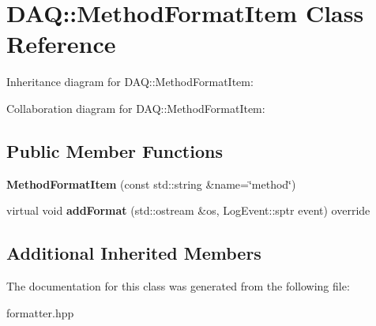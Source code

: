\hypertarget{classDAQ_1_1MethodFormatItem}{}\section{D\+AQ\+:\+:Method\+Format\+Item Class Reference}
\label{classDAQ_1_1MethodFormatItem}


Inheritance diagram for D\+AQ\+:\+:Method\+Format\+Item\+:


Collaboration diagram for D\+AQ\+:\+:Method\+Format\+Item\+:
\subsection*{Public Member Functions}
\begin{DoxyCompactItemize}
\item 
\mbox{\label{classDAQ_1_1MethodFormatItem_a5f5ff7e74d5b57439f9d1018093a7abe}} 
{\bfseries Method\+Format\+Item} (const std\+::string \&name=\char`\"{}method\char`\"{})
\item 
\mbox{\label{classDAQ_1_1MethodFormatItem_a1b027d147aee9bb5ac113894d18a5289}} 
virtual void {\bfseries add\+Format} (std\+::ostream \&os, Log\+Event\+::sptr event) override
\end{DoxyCompactItemize}
\subsection*{Additional Inherited Members}


The documentation for this class was generated from the following file\+:\begin{DoxyCompactItemize}
\item 
formatter.\+hpp\end{DoxyCompactItemize}

